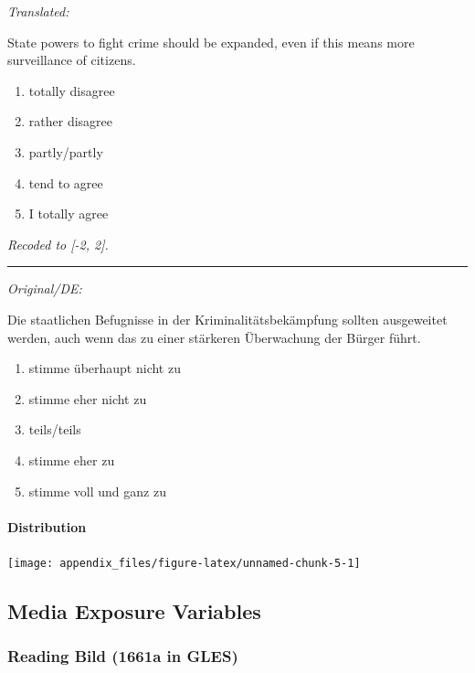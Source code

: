 \documentclass[
]{article}
\providecommand{\tightlist}{%
  \setlength{\itemsep}{0pt}\setlength{\parskip}{0pt}}
\begin{document}
\emph{Translated:}

State powers to fight crime should be expanded, even if this means more surveillance of citizens.

\begin{enumerate}
\def\labelenumi{(\arabic{enumi})}
\tightlist
\item
  totally disagree
\item
  rather disagree
\item
  partly/partly
\item
  tend to agree
\item
  I totally agree
\end{enumerate}

\emph{Recoded to {[}-2, 2{]}.}

\begin{center}\rule{0.5\linewidth}{0.5pt}\end{center}

\emph{Original/DE:}

Die staatlichen Befugnisse in der Kriminalitätsbekämpfung sollten ausgeweitet werden, auch wenn das zu einer stärkeren Überwachung der Bürger führt.

\begin{enumerate}
\def\labelenumi{(\arabic{enumi})}
\tightlist
\item
  stimme überhaupt nicht zu
\item
  stimme eher nicht zu
\item
  teils/teils
\item
  stimme eher zu
\item
  stimme voll und ganz zu
\end{enumerate}

\hypertarget{distribution-4}{%
\paragraph{Distribution}\label{distribution-4}}

\begin{center}\texttt{[image: appendix\_files/figure-latex/unnamed-chunk-5-1]} \end{center}

\hypertarget{media-exposure-variables}{%
\subsection{Media Exposure Variables}\label{media-exposure-variables}}

\hypertarget{reading-bild-1661a-in-gles}{%
\subsubsection{Reading Bild (1661a in GLES)}\label{reading-bild-1661a-in-gles}}
\end{document}
